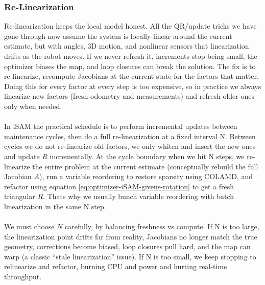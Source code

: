 \subsubsection{Re-Linearization}
Re-linearization keeps the local model honest. All the QR/update tricks we have gone through now assume the system is locally linear around the current estimate, but with angles, 3D motion, and nonlinear sensors that linearization drifts as the robot moves. If we never refresh it, increments stop being small, the optimizer biases the map, and loop closures can break the solution. The fix is to re-linearize, recompute Jacobians at the current state for the factors that matter. Doing this for every factor at every step is too expensive, so in practice we always linearize new factors (fresh odometry and measurements) and refresh older ones only when needed.
\\ \\
In iSAM the practical schedule is to perform incremental updates between maintenance cycles, then do a full re-linearization at a fixed interval N. Between cycles we do not re-linearize old factors, we only whiten and insert the new ones and update $R$ incrementally. At the cycle boundary when we hit N steps, we re-linearize the entire problem at the current estimate (conceptually rebuild the full Jacobian $A$), run a variable reordering to restore sparsity using COLAMD, and refactor using equation \eqref{eq:optimizer-iSAM-givens-rotation} to get a fresh triangular $R$. Thats why we usually bunch variable reordering with batch linearization in the same N step. 
\\ \\
We must choose $N$ carefully, by balancing freshness vs compute. If N is too large, the linearization point drifts far from reality, Jacobians no longer match the true geometry, corrections become biased, loop closures pull hard, and the map can warp (a classic ``stale linearization'' issue). If N is too small, we keep stopping to relinearize and refactor, burning CPU and power and hurting real-time throughput.



